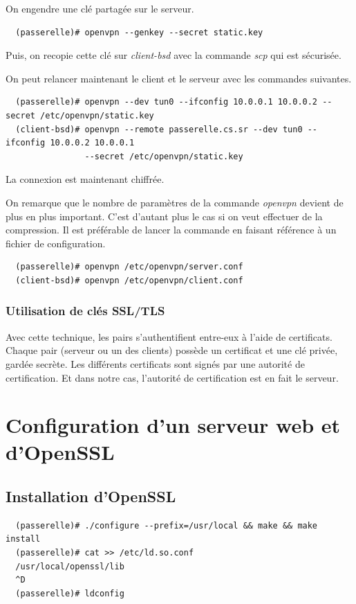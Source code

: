 \documentclass[a4paper]{article}
\begin{document}
On engendre une clé partagée sur le serveur.
\begin{verbatim}
  (passerelle)# openvpn --genkey --secret static.key
\end{verbatim}

Puis, on recopie cette clé sur \textit{client-bsd} avec la commande \textit{scp}
qui est sécurisée.

On peut relancer maintenant le client et le serveur avec les commandes suivantes.
\begin{verbatim}
  (passerelle)# openvpn --dev tun0 --ifconfig 10.0.0.1 10.0.0.2 --secret /etc/openvpn/static.key
  (client-bsd)# openvpn --remote passerelle.cs.sr --dev tun0 --ifconfig 10.0.0.2 10.0.0.1 
                --secret /etc/openvpn/static.key
\end{verbatim}

La connexion est maintenant chiffrée.

On remarque que le nombre de paramètres de la commande \textit{openvpn} devient
de plus en plus important. C'est d'autant plus le cas si on veut effectuer 
de la compression. 
Il est préférable de lancer la commande en faisant référence à un fichier de configuration.
\begin{verbatim}
  (passerelle)# openvpn /etc/openvpn/server.conf
  (client-bsd)# openvpn /etc/openvpn/client.conf
\end{verbatim}

\subsubsection{Utilisation de clés SSL/TLS}

Avec cette technique, les pairs s'authentifient entre-eux à l'aide de certificats.
Chaque pair (serveur ou un des clients) possède un certificat et une clé privée, gardée secrète.
Les différents certificats sont signés par une autorité de certification. Et dans notre cas,
l'autorité de certification est en fait le serveur.



\section{Configuration d'un serveur web et d'OpenSSL}
\subsection{Installation d'OpenSSL}
\begin{verbatim}
  (passerelle)# ./configure --prefix=/usr/local && make && make install
  (passerelle)# cat >> /etc/ld.so.conf
  /usr/local/openssl/lib
  ^D
  (passerelle)# ldconfig
\end{verbatim}
\end{document}
